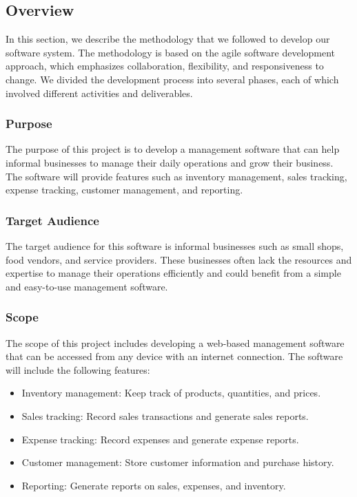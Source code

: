 \documentclass{article}
\begin{document}
\subsection{Overview}

In this section, we describe the methodology that we followed to develop our software system. The methodology is based on the agile software development approach, which emphasizes collaboration, flexibility, and responsiveness to change. We divided the development process into several phases, each of which involved different activities and deliverables.

\subsubsection{Purpose}
The purpose of this project is to develop a management software that can help informal businesses to manage their daily operations and grow their business. The software will provide features such as inventory management, sales tracking, expense tracking, customer management, and reporting.

\subsubsection{Target Audience}
The target audience for this software is informal businesses such as small shops, food vendors, and service providers. These businesses often lack the resources and expertise to manage their operations efficiently and could benefit from a simple and easy-to-use management software.

\subsubsection{Scope}
The scope of this project includes developing a web-based management software that can be accessed from any device with an internet connection. The software will include the following features:

\begin{itemize}
    \item Inventory management: Keep track of products, quantities, and prices.
    \item Sales tracking: Record sales transactions and generate sales reports.
    \item Expense tracking: Record expenses and generate expense reports.
    \item Customer management: Store customer information and purchase history.
    \item Reporting: Generate reports on sales, expenses, and inventory.
\end{itemize}
\newpage
\end{document}
